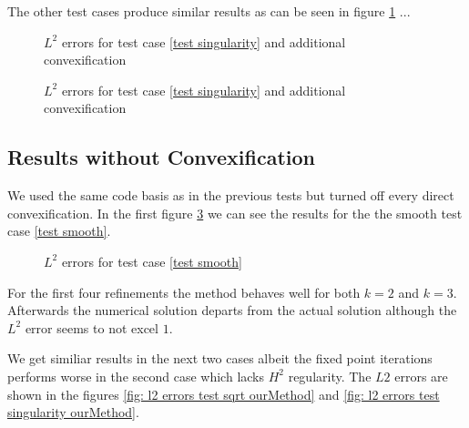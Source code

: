The other test cases produce similar results as can be seen in figure \ref{fig: l2 errors test singularity ourMethodConvex} ... \todo{}

\begin{figure}[H]
\centering
	\caption{$L^2$ errors for test case \ref{test singularity} and additional convexification}
	\label{fig: l2 errors test singularity ourMethodConvex}
\end{figure}
\begin{figure}[H]
\centering
	\caption{$L^2$ errors for test case \ref{test singularity} and additional convexification}
	\label{fig: Compare test singularity ourMethodConvex}
\end{figure}



\subsection{Results without Convexification}

We used the same code basis as in the previous tests but turned off every direct convexification.
In the first figure \ref{fig: l2 errors test smooth ourMethod} we can see the results for the the smooth test case \ref{test smooth}.
\begin{figure}[h!]
	\centering
	\caption{$L^2$ errors for test case \ref{test smooth}}
	\label{fig: l2 errors test smooth ourMethod}
\end{figure}
 For the first four refinements the method behaves well for both $k=2$ and $k=3$. Afterwards the numerical solution departs from the actual solution although the $L^2$ error seems to not excel $1$.
 
 We get similiar results in the next two cases albeit the fixed point iterations performs worse in the second case which lacks $H^2$ regularity. The $L2$ errors are shown in the figures \ref{fig: l2 errors test sqrt ourMethod} and \ref{fig: l2 errors test singularity ourMethod}.
 
